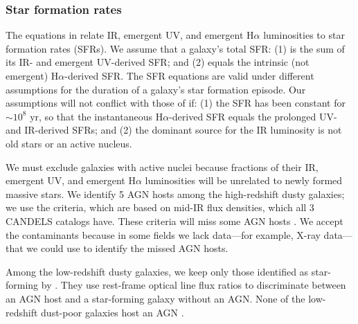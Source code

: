\documentclass[preprint]{aastex}
\begin{document}
\subsubsection{Star formation rates}\label{sfrs}

The equations in \citet{kennicutt98} relate IR, emergent UV, and emergent
H$\alpha$ luminosities to star formation rates (SFRs).  We assume
that a galaxy's total SFR: (1) is the sum of its IR- and emergent UV-derived
SFR; and (2) equals the intrinsic (not emergent)
H$\alpha$-derived SFR.  The SFR equations are valid under different assumptions
for the duration of a galaxy's star formation episode.  Our assumptions will not
conflict with those of \citet{kennicutt98} if: (1) the SFR has been
constant for $\sim 10^{8}$ yr, so that the instantaneous H$\alpha$-derived SFR
equals the prolonged UV- and IR-derived SFRs; and (2) the dominant
source for the IR luminosity is not old stars or an active nucleus.

We must exclude galaxies with active nuclei because fractions of their IR,
emergent UV, and emergent H$\alpha$ luminosities will be unrelated to newly
formed massive stars.  We identify 5 AGN hosts among the high-redshift dusty
galaxies; we use the \citet{donley12} criteria, which are based on mid-IR flux
densities, which all 3 CANDELS catalogs have.  These criteria will miss some
AGN hosts \citep{juneau13}.  We accept the contaminants because in some fields
we lack data---for example, X-ray data---that we could use to identify the
missed AGN hosts.

Among the low-redshift dusty
galaxies, we keep only those identified as star-forming by \citet{hwang13}.
They use rest-frame optical line flux ratios to discriminate between an AGN host
and a star-forming galaxy without an AGN.  None of the low-redshift dust-poor
galaxies host an AGN \citep{overzier11}.
\end{document}
